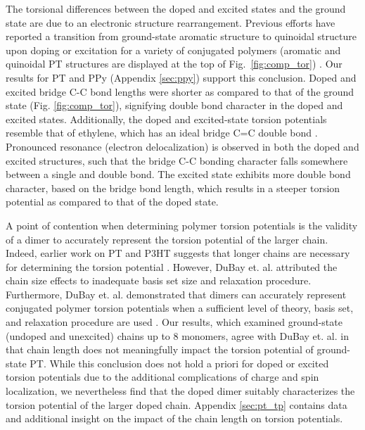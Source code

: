 The torsional differences between the doped and excited states and the ground state are due to an electronic structure rearrangement. Previous efforts have reported a transition from ground-state aromatic structure to quinoidal structure upon doping or excitation for a variety of conjugated polymers (aromatic and quinoidal PT structures are displayed at the top of Fig.~\ref{fig:comp_tor}) \cite{Roth2013_ch5, Burrezo2017, Wells2008, Aime1989, Banerji2011, Roseli2017, Busby2011, Yu2014, Fonner2010, Baitoul2000, Bradley1989}. Our results for PT and PPy (Appendix \ref{sec:ppy}) support this conclusion. Doped and excited bridge C-C bond lengths were shorter as compared to that of the ground state (Fig. \ref{fig:comp_tor}), signifying double bond character in the doped and excited states. Additionally, the doped and excited-state torsion potentials resemble that of ethylene, which has an ideal bridge C=C double bond \cite{Shao2003}. Pronounced resonance (electron delocalization) is observed in both the doped and excited structures, such that the bridge C-C bonding character falls somewhere between a single and double bond. The excited state exhibits more double bond character, based on the bridge bond length, which results in a steeper torsion potential as compared to that of the doped state.

A point of contention when determining polymer torsion potentials is the validity of a dimer to accurately represent the torsion potential of the larger chain. Indeed, earlier work on PT and P3HT suggests that longer chains are necessary for determining the torsion potential \cite{Darling2009}. However, DuBay et. al. attributed the chain size effects to inadequate basis set size and relaxation procedure. Furthermore, DuBay et. al. demonstrated that dimers can accurately represent conjugated polymer torsion potentials when a sufficient level of theory, basis set, and relaxation procedure are used \cite{Dubay2012}. Our results, which examined ground-state (undoped and unexcited) chains up to 8 monomers, agree with DuBay et. al. in that chain length does not meaningfully impact the torsion potential of ground-state PT. While this conclusion does not hold a priori for doped or excited torsion potentials due to the additional complications of charge and spin localization, we nevertheless find that the doped dimer suitably characterizes the torsion potential of the larger doped chain. Appendix \ref{sec:pt_tp} contains data and additional insight on the impact of the chain length on torsion potentials.

